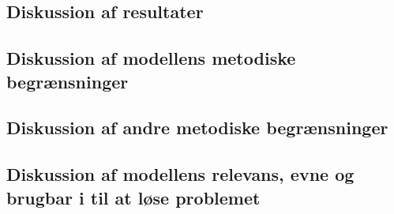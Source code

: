 
\subsection{Diskussion af resultater}


\subsection{Diskussion af modellens metodiske begrænsninger}

\subsection{Diskussion af andre metodiske begrænsninger}

\subsection{Diskussion af modellens relevans, evne og brugbar i til at løse problemet}